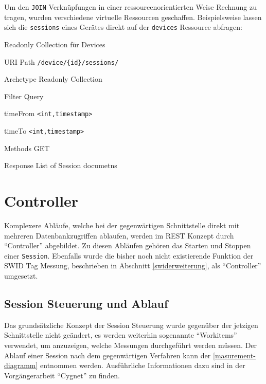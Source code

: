 Um den \texttt{JOIN} Verknüpfungen in einer ressourcenorientierten Weise
Rechnung zu tragen, wurden verschiedene virtuelle Ressourcen geschaffen.
Beispielsweise lassen sich die \texttt{sessions} eines Gerätes direkt auf der
\texttt{devices} Ressource abfragen:

\begin{listing}[H]
\caption{Readonly Collection für Devices}
\begin{mdframed}[style=def]
\begin{description*}
	\item[URI Path] \texttt{/device/\{id\}/sessions/}
	\item[Archetype] Readonly Collection
	\item[Filter Query] \hfill
	\begin{description*}
		\item[timeFrom] \texttt{<int,timestamp>}
		\item[timeTo] \texttt{<int,timestamp>}
	\end{description*}	
	\item[Methods] GET
	\item[Response] List of Session documetns
\end{description*}
\end{mdframed}
\end{listing}

\section{Controller}
Komplexere Abläufe, welche bei der gegenwärtigen Schnittstelle direkt mit
mehreren Datenbankzugriffen ablaufen, werden im REST Konzept durch
\enquote{Controller} abgebildet. Zu diesen Abläufen gehören das Starten und
Stoppen einer \texttt{Session}. Ebenfalls wurde die bisher noch nicht
existierende Funktion der SWID Tag Messung, beschrieben in Abschnitt
\ref{swiderweiterung}, als \enquote{Controller} umgesetzt.

\subsection{Session Steuerung und Ablauf}
Das grundsätzliche Konzept der Session Steuerung wurde gegenüber der jetzigen
Schnittstelle nicht geändert, es werden weiterhin sogenannte \enquote{Workitems}
verwendet, um anzuzeigen, welche Messungen durchgeführt werden müssen. Der Ablauf
einer Session nach dem gegenwärtigen Verfahren kann der 
\autoref{masurement-diagramm} entnommen werden. Ausführliche
Informationen dazu sind in der Vorgängerarbeit
\enquote{Cygnet}\cite{cygnet:2013} zu finden.

